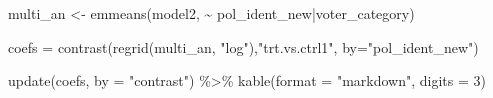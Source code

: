 \documentclass[
  letterpaper,
  DIV=11,
  numbers=noendperiod]{scrartcl}
\newenvironment{Shaded}{\begin{snugshade}}{\end{snugshade}}
\newcommand{\AttributeTok}[1]{\textcolor[rgb]{0.40,0.45,0.13}{#1}}
\newcommand{\DecValTok}[1]{\textcolor[rgb]{0.68,0.00,0.00}{#1}}
\newcommand{\FunctionTok}[1]{\textcolor[rgb]{0.28,0.35,0.67}{#1}}
\newcommand{\NormalTok}[1]{\textcolor[rgb]{0.00,0.23,0.31}{#1}}
\newcommand{\OtherTok}[1]{\textcolor[rgb]{0.00,0.23,0.31}{#1}}
\newcommand{\SpecialCharTok}[1]{\textcolor[rgb]{0.37,0.37,0.37}{#1}}
\newcommand{\StringTok}[1]{\textcolor[rgb]{0.13,0.47,0.30}{#1}}
\begin{document}
\begin{Shaded}
\begin{Highlighting}[]
\NormalTok{multi\_an }\OtherTok{\textless{}{-}} \FunctionTok{emmeans}\NormalTok{(model2, }\SpecialCharTok{\textasciitilde{}}\NormalTok{ pol\_ident\_new}\SpecialCharTok{|}\NormalTok{voter\_category)}

\NormalTok{coefs }\OtherTok{=} \FunctionTok{contrast}\NormalTok{(}\FunctionTok{regrid}\NormalTok{(multi\_an, }\StringTok{"log"}\NormalTok{),}\StringTok{"trt.vs.ctrl1"}\NormalTok{,  }\AttributeTok{by=}\StringTok{"pol\_ident\_new"}\NormalTok{)}

\FunctionTok{update}\NormalTok{(coefs, }\AttributeTok{by =} \StringTok{"contrast"}\NormalTok{) }\SpecialCharTok{\%\textgreater{}\%} 
  \FunctionTok{kable}\NormalTok{(}\AttributeTok{format =} \StringTok{"markdown"}\NormalTok{, }\AttributeTok{digits =} \DecValTok{3}\NormalTok{)}
\end{Highlighting}
\end{Shaded}
\end{document}

